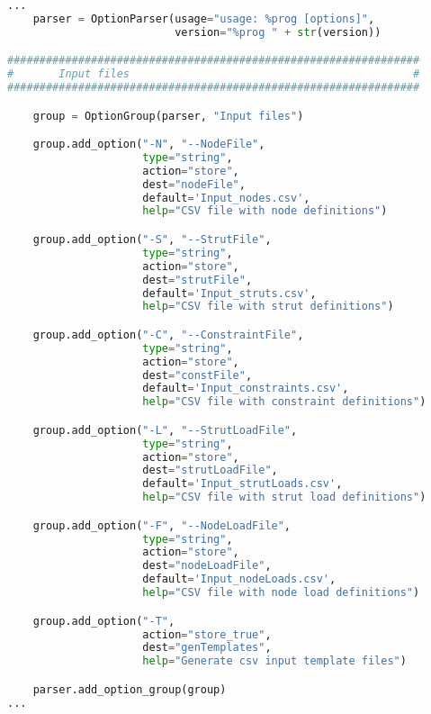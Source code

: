 \begin{inconsolata}
\begin{minipage}{\linewidth}
\begin{lstlisting}[language=python]
...
    parser = OptionParser(usage="usage: %prog [options]",
                          version="%prog " + str(version))

################################################################
#       Input files                                            #
################################################################

    group = OptionGroup(parser, "Input files")

    group.add_option("-N", "--NodeFile",
                     type="string",
                     action="store",
                     dest="nodeFile",
                     default='Input_nodes.csv',
                     help="CSV file with node definitions")

    group.add_option("-S", "--StrutFile",
                     type="string",
                     action="store",
                     dest="strutFile",
                     default='Input_struts.csv',
                     help="CSV file with strut definitions")

    group.add_option("-C", "--ConstraintFile",
                     type="string",
                     action="store",
                     dest="constFile",
                     default='Input_constraints.csv',
                     help="CSV file with constraint definitions")

    group.add_option("-L", "--StrutLoadFile",
                     type="string",
                     action="store",
                     dest="strutLoadFile",
                     default='Input_strutLoads.csv',
                     help="CSV file with strut load definitions")

    group.add_option("-F", "--NodeLoadFile",
                     type="string",
                     action="store",
                     dest="nodeLoadFile",
                     default='Input_nodeLoads.csv',
                     help="CSV file with node load definitions")

    group.add_option("-T",
                     action="store_true",
                     dest="genTemplates",
                     help="Generate csv input template files")

    parser.add_option_group(group)
...
\end{lstlisting}
\end{minipage}
\end{inconsolata}


